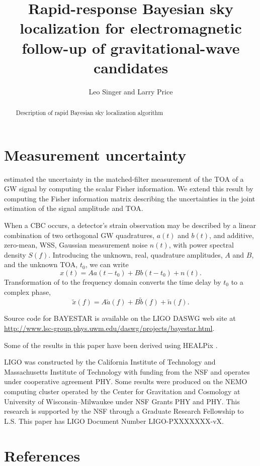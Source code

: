 \documentclass{iopart}
\begin{document}
\title[Rapid-response Bayesian sky localization]{Rapid-response Bayesian sky localization for electromagnetic follow-up of gravitational-wave candidates}
\author{Leo Singer and Larry Price}
\address{LIGO Laboratory, California Institute of Technology, Pasadena, CA 91125, USA}

\begin{abstract}
Description of rapid Bayesian sky localization algorithm
\end{abstract}

\section{Measurement uncertainty}
\cite{fairhurst:2009} estimated the uncertainty in the matched-filter measurement of the \ac{TOA} of a \ac{GW} signal by computing the scalar Fisher information.  We extend this result by computing the Fisher information matrix describing the uncertainties in the joint estimation of the signal amplitude and \ac{TOA}.

When a \ac{CBC} occurs, a detector's strain observation may be described by a linear combination of two orthogonal \ac{GW} quadratures, $a(t)$ and $b(t)$, and additive, zero\nobreakdashes-mean, \acl{WSS}, Gaussian measurement noise $n(t)$, with power spectral density $S(f)$.  Introducing the unknown, real, quadrature amplitudes, $A$ and $B$, and the unknown \ac{TOA}, $t_0$, we can write
%
\begin{equation}\label{eq:xoft}
	x(t) = A a(t - t_0) + B b(t - t_0) + n(t).
\end{equation}
%
Transformation of  to the frequency domain converts the time delay by $t_0$ to a complex phase,
%
\begin{equation}\label{eq:xoff}
	\tilde{x}(f) = A \tilde{a}(f) + B \tilde{b}(f) + \tilde{n}(f).
\end{equation}
%


\ack Source code for \ac{BAYESTAR} is available on the \acs{LIGO} \acl{DASWG} web site at \url{http://www.lsc-group.phys.uwm.edu/daswg/projects/bayestar.html}.

Some of the results in this paper have been derived using HEALPix \cite{healpix}.

\acs{LIGO} was constructed by the California Institute of Technology and Massachusetts Institute of Technology with funding from the \ac{NSF} and operates under cooperative agreement PHY.  Some results were produced on the NEMO computing cluster operated by the Center for Gravitation and Cosmology at University of Wisconsin\nobreakdashes--Milwaukee under \ac{NSF} Grants PHY and PHY.  This research is supported by the \ac{NSF} through a Graduate Research Fellowship to L.S.  This paper has \acs{LIGO} Document Number \acs{LIGO}\nobreakdashes-PXXXXXXX\nobreakdashes-vX.


\section*{References}


\end{document}

